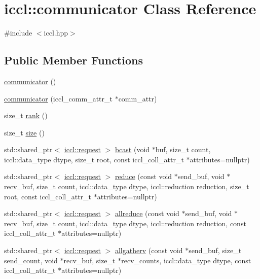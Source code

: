 \hypertarget{classiccl_1_1communicator}{\section{iccl\-:\-:communicator Class Reference}
\label{classiccl_1_1communicator}
}


{\ttfamily \#include $<$iccl.\-hpp$>$}

\subsection*{Public Member Functions}
\begin{DoxyCompactItemize}
\item 
\hyperlink{classiccl_1_1communicator_a735f10802f59fd63c962dfe9c2848a3a}{communicator} ()
\item 
\hyperlink{classiccl_1_1communicator_a16b3ccac7a5de0bbadb28b77a0f8581b}{communicator} (iccl\-\_\-comm\-\_\-attr\-\_\-t $\ast$comm\-\_\-attr)
\item 
size\-\_\-t \hyperlink{classiccl_1_1communicator_a3d001d3757344683dcd86ef60048d34c}{rank} ()
\item 
size\-\_\-t \hyperlink{classiccl_1_1communicator_a568b4d294bebbb04bb3203cd1bc209c0}{size} ()
\item 
std\-::shared\-\_\-ptr$<$ \hyperlink{classiccl_1_1request}{iccl\-::request} $>$ \hyperlink{classiccl_1_1communicator_a79de571c5a4d83637c49fb9a442e5cfb}{bcast} (void $\ast$buf, size\-\_\-t count, iccl\-::data\-\_\-type dtype, size\-\_\-t root, const iccl\-\_\-coll\-\_\-attr\-\_\-t $\ast$attributes=nullptr)
\item 
std\-::shared\-\_\-ptr$<$ \hyperlink{classiccl_1_1request}{iccl\-::request} $>$ \hyperlink{classiccl_1_1communicator_aec180748e4a2872d3490dac77a427025}{reduce} (const void $\ast$send\-\_\-buf, void $\ast$recv\-\_\-buf, size\-\_\-t count, iccl\-::data\-\_\-type dtype, iccl\-::reduction reduction, size\-\_\-t root, const iccl\-\_\-coll\-\_\-attr\-\_\-t $\ast$attributes=nullptr)
\item 
std\-::shared\-\_\-ptr$<$ \hyperlink{classiccl_1_1request}{iccl\-::request} $>$ \hyperlink{classiccl_1_1communicator_a7fe99e9d8579b4dc58db179b5d8c44fe}{allreduce} (const void $\ast$send\-\_\-buf, void $\ast$recv\-\_\-buf, size\-\_\-t count, iccl\-::data\-\_\-type dtype, iccl\-::reduction reduction, const iccl\-\_\-coll\-\_\-attr\-\_\-t $\ast$attributes=nullptr)
\item 
std\-::shared\-\_\-ptr$<$ \hyperlink{classiccl_1_1request}{iccl\-::request} $>$ \hyperlink{classiccl_1_1communicator_a49762be4f90635fc78dcf9a6649e9d31}{allgatherv} (const void $\ast$send\-\_\-buf, size\-\_\-t send\-\_\-count, void $\ast$recv\-\_\-buf, size\-\_\-t $\ast$recv\-\_\-counts, iccl\-::data\-\_\-type dtype, const iccl\-\_\-coll\-\_\-attr\-\_\-t $\ast$attributes=nullptr)

\end{DoxyCompactItemize}
